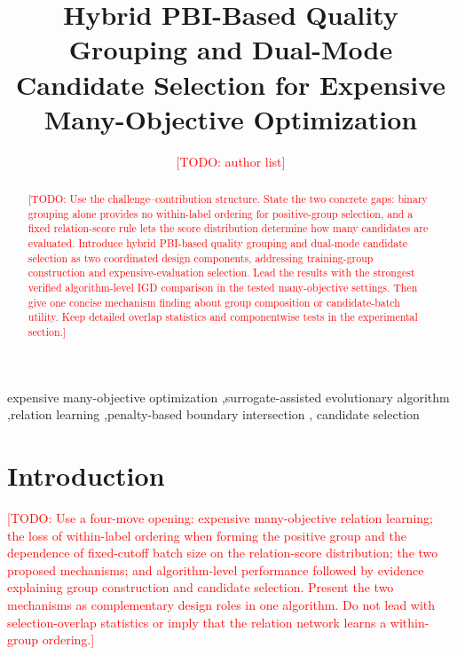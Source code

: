 \documentclass[final,5p,times,twocolumn]{elsarticle}
\newcommand{\TODO}[1]{\textcolor{red}{[TODO: #1]}}
\begin{document}
\begin{frontmatter}

\title{Hybrid PBI-Based Quality Grouping and Dual-Mode Candidate Selection
for Expensive Many-Objective Optimization}

\author{\TODO{author list}}


\begin{abstract}
\TODO{Use the challenge--contribution structure. State the two concrete gaps:
binary grouping alone provides no within-label ordering for positive-group selection,
and a fixed relation-score rule lets the score distribution determine how many
candidates are evaluated. Introduce hybrid PBI-based quality grouping and
dual-mode candidate selection as two coordinated design components, addressing
training-group construction and expensive-evaluation selection. Lead the results
with the strongest verified algorithm-level IGD comparison in the tested
many-objective settings. Then give one concise mechanism finding about group
composition or candidate-batch utility. Keep detailed overlap statistics and
componentwise tests in the experimental section.}
\end{abstract}

\begin{keyword}
expensive many-objective optimization \sep surrogate-assisted evolutionary
algorithm \sep relation learning \sep penalty-based boundary intersection \sep
candidate selection
\end{keyword}

\end{frontmatter}

\section{Introduction}
\label{sec:intro}

\TODO{Use a four-move opening: expensive many-objective relation learning; the
loss of within-label ordering when forming the positive group and the dependence of
fixed-cutoff batch size on the relation-score distribution; the two proposed
mechanisms; and algorithm-level performance followed by evidence explaining
group construction and candidate selection. Present the two mechanisms as
complementary design roles in one algorithm. Do not lead with selection-overlap
statistics or imply that the relation network learns a within-group ordering.}
\end{document}

